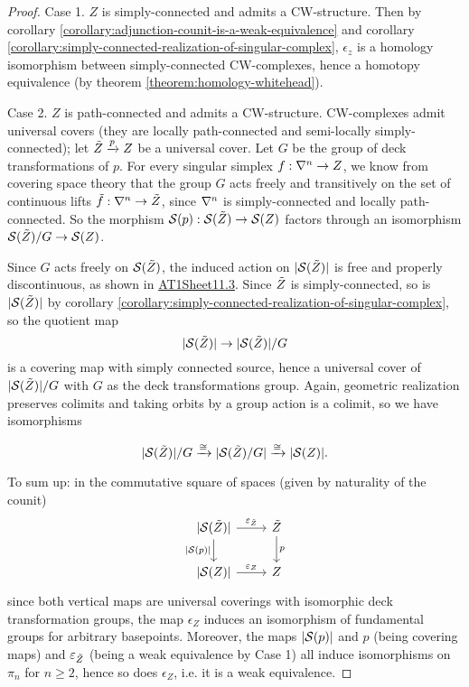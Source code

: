 \begin{proof}
Case 1. $Z$ is simply-connected and admits a CW-structure. Then by corollary \ref{corollary:adjunction-counit-is-a-weak-equivalence} and corollary \ref{corollary:simply-connected-realization-of-singular-complex}, $\epsilon_z$ is a homology isomorphism between simply-connected CW-complexes, hence a homotopy equivalence (by theorem \ref{theorem:homology-whitehead}).

Case 2. $Z$ is path-connected and admits a CW-structure. CW-complexes admit universal covers (they are locally path-connected and semi-locally simply-connected); let $\til Z\xto{p}Z$ be a universal cover. Let $G$ be the group of deck transformations of $p$. For every singular simplex $f:\ns\to Z$, we know from covering space theory that the group $G$ acts freely and transitively on the set of continuous lifts $\til f:\ns\to \til Z$, since $\ns$ is simply-connected and locally path-connected. So the morphism $\S(p):\S(\til Z)\to\S(Z)$ factors through an isomorphism $\S(\til Z)/G\to\S(Z)$.

Since $G$ acts freely on $\S(\til Z)$, the induced action on $|\S(\til Z)|$ is free and properly discontinuous, as shown in \hyperref[exercise:AT1Sheet11.3]{AT1Sheet11.3}. Since $\til Z$ is simply-connected, so is $|\S(\til Z)|$ by corollary \ref{corollary:simply-connected-realization-of-singular-complex}, so the quotient map
\[|\S(\til Z)|\to|\S(\til Z)|/G\]
is a covering map with simply connected source, hence a universal cover of $|\S(\til Z)|/G$ with $G$ as the deck transformations group. Again, geometric realization preserves colimits and taking orbits by a group action is a colimit, so we have isomorphisms

\[|\S(\til Z)|/G\xto{\cong}|\S(\til Z)/G|\xto{\cong}|\S(Z)|.\]

To sum up: in the commutative square of spaces (given by naturality of the counit)
\[
\begin{tikzcd}
{|\S(\til Z)|} \ar[d,"{|\S(p)|}"'] \ar[r,"\epsilon_{\til Z}"] & \til Z \ar[d,"p"]\\
{|\S(Z)|} \ar[r,"\epsilon_Z"] & Z
\end{tikzcd}
\]
since both vertical maps are universal coverings with isomorphic deck transformation groups, the map $\epsilon_Z$ induces an isomorphism of fundamental groups for arbitrary basepoints. Moreover, the maps $|\S(p)|$ and $p$ (being covering maps) and $\epsilon_{\til Z}$ (being a weak equivalence by Case 1) all induce isomorphisms on $\pi_n$ for $n\ge2$, hence so does $\epsilon_Z$, i.e. it is a weak equivalence.


\end{proof}
